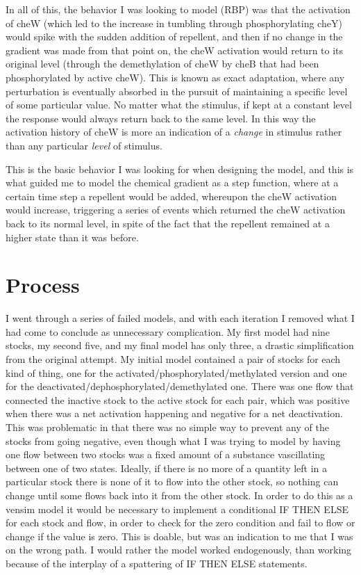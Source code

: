 \documentclass[12pt]{article}
\begin{document}
In all of this, the behavior I was looking to model (RBP) was that the activation of cheW (which led to the increase in tumbling through phosphorylating cheY) would spike with the sudden addition of repellent, and then if no change in the gradient was made from that point on, the cheW activation would return to its original level (through the demethylation of cheW by cheB that had been phosphorylated by active cheW).  This is known as exact adaptation, where any perturbation is eventually absorbed in the pursuit of maintaining a specific level of some particular value.  No matter what the stimulus, if kept at a constant level the response would always return back to the same level.  In this way the activation history of cheW is more an indication of a {\em change} in stimulus rather than any particular {\em level} of stimulus.  

This is the basic behavior I was looking for when designing the model, and this is what guided me to model the chemical gradient as a step function, where at a certain time step a repellent would be added, whereupon the cheW activation would increase, triggering a series of events which returned the cheW activation back to its normal level, in spite of the fact that the repellent remained at a higher state than it was before.

\section{Process}

I went through a series of failed models, and with each iteration I removed what I had come to conclude as unnecessary complication.  My first model had nine stocks, my second five, and my final model has only three, a drastic simplification from the original attempt.  My initial model contained a pair of stocks for each kind of thing, one for the activated/phosphorylated/methylated version and one for the deactivated/dephosphorylated/demethylated one.  There was one flow that connected the inactive stock to the active stock for each pair, which was positive when there was a net activation happening and negative for a net deactivation.  This was problematic in that there was no simple way to prevent any of the stocks from going negative, even though what I was trying to model by having one flow between two stocks was a fixed amount of a substance vascillating between one of two states.  Ideally, if there is no more of a quantity left in a particular stock there is none of it to flow into the other stock, so nothing can change until some flows back into it from the other stock.  In order to do this as a vensim model it would be necessary to implement a conditional IF THEN ELSE for each stock and flow, in order to check for the zero condition and fail to flow or change if the value is zero.  This is doable, but was an indication to me that I was on the wrong path.  I would rather the model worked endogenously, than working because of the interplay of a spattering of IF THEN ELSE statements.  
\end{document}
